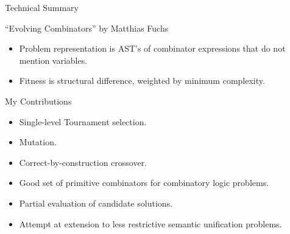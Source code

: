 \documentclass[mathserif]{beamer}
\begin{document}
\begin{frame}{Technical Summary}

\begin{block}{``Evolving Combinators'' by Matthias Fuchs}
\begin{itemize}
\item Problem representation is AST's of combinator expressions that
  do not mention variables.
\item Fitness is structural difference, weighted by minimum complexity.
\end{itemize}

\begin{block}{My Contributions}
\begin{itemize}
\item Single-level Tournament selection.
\item Mutation.
\item Correct-by-construction crossover.
\item Good set of primitive combinators for combinatory logic problems.
\item Partial evaluation of candidate solutions.
\item Attempt at extension to less restrictive semantic unification problems.
\end{itemize}
\end{block}



\end{block}


\end{frame}
\end{document}
